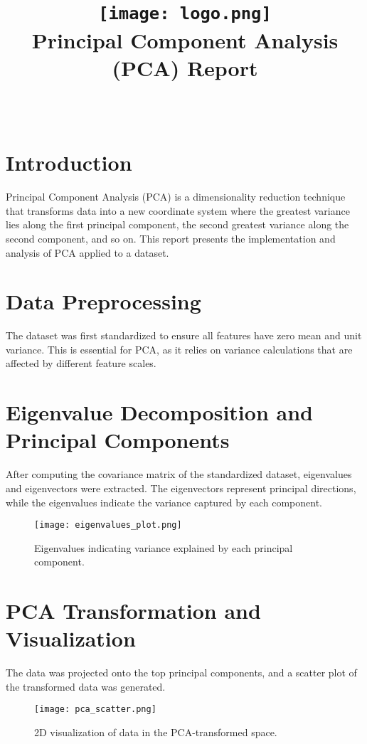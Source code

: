 \documentclass{article}
\title{
    \texttt{[image: logo.png]} \\
    Principal Component Analysis (PCA) Report
}
\author{\FirstAuthor \\\SecondAuthor}
\date{}
\begin{document}
\maketitle

\section*{Introduction}
Principal Component Analysis (PCA) is a dimensionality reduction technique that transforms data into a new coordinate system where the greatest variance lies along the first principal component, the second greatest variance along the second component, and so on. This report presents the implementation and analysis of PCA applied to a dataset.

\section*{Data Preprocessing}
The dataset was first standardized to ensure all features have zero mean and unit variance. This is essential for PCA, as it relies on variance calculations that are affected by different feature scales.

\section*{Eigenvalue Decomposition and Principal Components}
After computing the covariance matrix of the standardized dataset, eigenvalues and eigenvectors were extracted. The eigenvectors represent principal directions, while the eigenvalues indicate the variance captured by each component.

\begin{figure}[h!]
    \centering
    \texttt{[image: eigenvalues\_plot.png]}  %
    \caption{Eigenvalues indicating variance explained by each principal component.}
    \label{fig:eigenvalues}
\end{figure}

\section*{PCA Transformation and Visualization}
The data was projected onto the top principal components, and a scatter plot of the transformed data was generated.

\begin{figure}[h!]
    \centering
    \texttt{[image: pca\_scatter.png]}  %
    \caption{2D visualization of data in the PCA-transformed space.}
    \label{fig:pca_scatter}
\end{figure}
\end{document}
